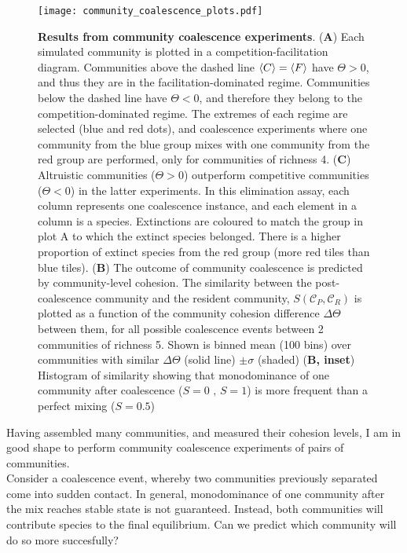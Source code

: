 \documentclass[titlepage,11pt]{article}
\begin{document}
\begin{linenumbers}
\begin{singlespace}
			\begin{figure}
				\centering			
				\texttt{[image: community\_coalescence\_plots.pdf]}
				\caption{\textbf{Results from community coalescence experiments}. (\textbf{A}) Each simulated community is plotted in a competition-facilitation diagram. Communities above the dashed line $ \braket{C} = \braket{F} $ have $ \Theta > 0 $, and thus they are in the facilitation-dominated regime. Communities below the dashed line have $ \Theta <0 $, and therefore they belong to the competition-dominated regime. The extremes of each regime are selected (blue and red dots), and coalescence experiments where one community from the blue group mixes with one community from the red group are performed, only for communities of richness 4. (\textbf{C}) Altruistic communities ($ \Theta > 0 $) outperform competitive communities ($ \Theta < 0 $) in the latter experiments. In this elimination assay, each column represents one coalescence instance, and each element in a column is a species. Extinctions are coloured to match the group in plot A to which the extinct species belonged. There is a higher proportion of extinct species from the red group (more red tiles than blue tiles). (\textbf{B}) The outcome of community coalescence is predicted by community-level cohesion.  The similarity between the post-coalescence community and the resident community, $ S (\mathcal{C}_P, \mathcal{C}_R) $ is plotted as a function of the community cohesion difference $ \Delta \Theta $ between them, for all possible coalescence events between 2 communities of richness 5. Shown is binned mean (100 bins) over communities with similar $ \Delta \Theta $ (solid line) $ \pm \sigma $ (shaded) (\textbf{B, inset}) Histogram of similarity showing that monodominance of one community after coalescence  ($ S = 0 \text{ , } S = 1 $) is more frequent than a perfect mixing ($ S = 0.5 $) }
				\label{fig:community_coalescence_results}
			\end{figure}
			Having assembled many communities, and measured their cohesion levels, I am in good shape to perform community coalescence experiments of pairs of communities. \\
			Consider a coalescence event, whereby two communities previously separated come into sudden contact. In general, monodominance of one community after the mix reaches stable state is not guaranteed. Instead, both communities will contribute species to the final equilibrium. Can we predict which community will do so more succesfully?\\

\end{singlespace}
\end{linenumbers}
\end{document}
